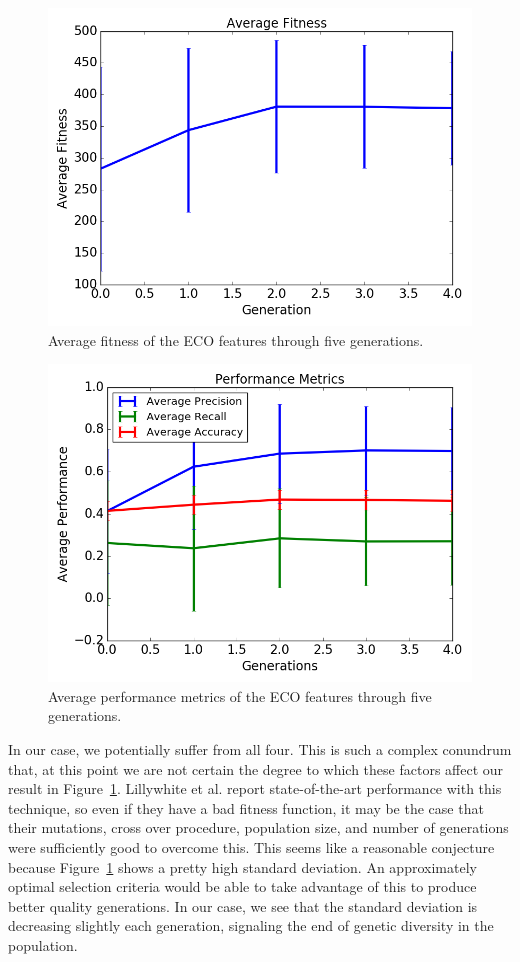 \documentclass[conference]{IEEEtran}
\begin{document}
\begin{figure}[t]
\centering
\includegraphics[width=\columnwidth]{average-fitness.png}
\caption{Average fitness of the ECO features through five generations.}
\label{fig:fitness}
\end{figure}
\begin{figure}[t]
\centering
\includegraphics[width=\columnwidth]{average-performance.png}
\caption{Average performance metrics of the ECO features through five generations.}
\label{fig:metrics}
\end{figure}
In our case, we potentially suffer from all four. This is such a complex conundrum that, at this point we are not certain the degree to which these factors affect our result in Figure~\ref{fig:fitness}. Lillywhite et al. report state-of-the-art performance with this technique, so even if they have a bad fitness function, it may be the case that their mutations, cross over procedure, population size, and number of generations were sufficiently good to overcome this. This seems like a reasonable conjecture because Figure~\ref{fig:fitness} shows a pretty high standard deviation. An approximately optimal selection criteria would be able to take advantage of this to produce better quality generations. In our case, we see that the standard deviation is decreasing slightly each generation, signaling the end of genetic diversity in the population.
\end{document}

